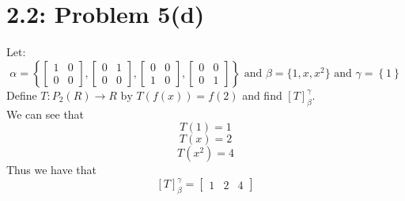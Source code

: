 \documentclass[answers,12pt,addpoints]{exam}
\begin{document}
\section*{2.2: Problem 5(d)}
Let: 
$$ \alpha = \left\{ \begin{bmatrix}
1 & 0 \\ 0 & 0
\end{bmatrix}, \begin{bmatrix}
0 & 1 \\ 0 & 0
\end{bmatrix}, \begin{bmatrix}
0 & 0 \\ 1 & 0
\end{bmatrix}, \begin{bmatrix}
0 & 0 \\ 0 & 1
\end{bmatrix} \right\} \text{ and } \beta = \{1, x, x^2\} \text{ and } \gamma = \left\{1\right\} $$
Define $T: P_2(R) \to R \text{ by } T(f(x)) = f(2)$ and find $[T]_{\beta}^{\gamma}$.\\
We can see that
$$ T(1) = 1 $$
$$ T(x) = 2 $$
$$ T(x^2) = 4 $$
Thus we have that
$$ [T]_{\beta}^{\gamma} = \begin{bmatrix}
1 & 2 & 4
\end{bmatrix} $$ 
\end{document}
